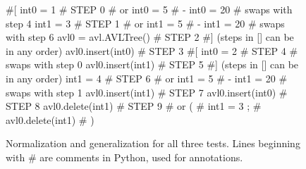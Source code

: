 \begin{figure}[t]
{\scriptsize
\begin{code}
\textcolor{black!60}{\#[}
int0 = 1                              \textcolor{black!60}{\# STEP 0}
\textcolor{black!60}{\#  or int0 = 5 }
\textcolor{black!60}{\#   - int0 = 20} 
\textcolor{black!60}{\#  swaps with step 4}
int1 = 3                              \textcolor{black!60}{\# STEP 1}
\textcolor{black!60}{\#  or int1 = 5 }
\textcolor{black!60}{\#   - int1 = 20} 
\textcolor{black!60}{\#  swaps with step 6}
avl0 = avl.AVLTree()                  \textcolor{black!60}{\# STEP 2}
\textcolor{black!60}{\#] (steps in [] can be in any order)}
avl0.insert(int0)                     \textcolor{black!60}{\# STEP 3}
\textcolor{black!60}{\#[}
int0 = 2                              \textcolor{black!60}{\# STEP 4}
\textcolor{black!60}{\#  swaps with step 0}
avl0.insert(int1)                     \textcolor{black!60}{\# STEP 5}
\textcolor{black!60}{\#] (steps in [] can be in any order)}
int1 = 4                              \textcolor{black!60}{\# STEP 6}
\textcolor{black!60}{\#  or int1 = 5 }
\textcolor{black!60}{\#   - int1 = 20} 
\textcolor{black!60}{\#  swaps with step 1}
avl0.insert(int1)                     \textcolor{black!60}{\# STEP 7}
avl0.insert(int0)                     \textcolor{black!60}{\# STEP 8}
avl0.delete(int1)                     \textcolor{black!60}{\# STEP 9}
\textcolor{black!60}{\#  or (}
\textcolor{black!60}{\#      int1 = 3  ;}
\textcolor{black!60}{\#      avl0.delete(int1) }
\textcolor{black!60}{\#     )}
\end{code}
}
\caption{{Normalization and generalization for all three tests.
  Lines beginning with \# are comments in Python, used for annotations.}}
\label{normalgen}
\end{figure}

